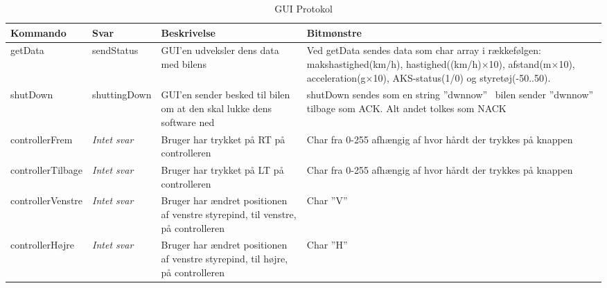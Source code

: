 \begin{table}[h]
\begin{tabularx}{\textwidth}{| Z | Z | Z | Z |} \hline

\textbf{Kommando} 						&
\textbf{Svar}							&
\textbf{Beskrivelse}					&
\textbf{Bitmønstre}						\\ \hline

getData &

sendStatus &

GUI'en udveksler dens data med bilens &

Ved getData sendes data som char array i rækkefølgen: makshastighed(km/h), hastighed((km/h)$\times$10), afstand(m$\times$10), acceleration(g$\times$10), AKS-status(1/0) og styretøj(-50..50). \\ \hline



shutDown &

shuttingDown &

GUI'en sender besked til bilen om at den skal lukke dens software ned &

shutDown sendes som en string ''dwnnow'' \
bilen sender ''dwnnow'' tilbage som ACK. Alt andet tolkes som NACK \\ \hline



controllerFrem &

\textit{Intet svar} &

Bruger har trykket på RT på controlleren &

Char fra 0-255 afhængig af hvor hårdt der trykkes på knappen \\ \hline



controllerTilbage &

\textit{Intet svar} &

Bruger har trykket på LT på controlleren &

Char fra 0-255 afhængig af hvor hårdt der trykkes på knappen \\ \hline



controllerVenstre &

\textit{Intet svar} &

Bruger har ændret positionen af venstre styrepind, til venstre, på controlleren &

Char ''V'' \\ \hline



controllerHøjre &

\textit{Intet svar} &

Bruger har ændret positionen af venstre styrepind, til højre, på controlleren &

Char ''H'' \\ \hline

\end{tabularx}
\caption{GUI Protokol}
\label{tbl:prt_gui}
\end{table}